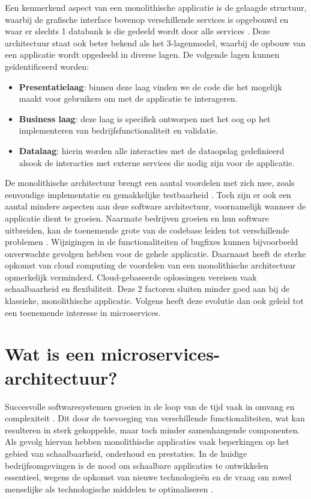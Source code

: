 Een kenmerkend aspect van een monolithische applicatie is de gelaagde structuur, waarbij de grafische interface bovenop verschillende services is opgebouwd en waar er slechts 1 databank is die gedeeld wordt door alle services \autocite{Velepucha2023}. Deze architectuur staat ook beter bekend als het 3-lagenmodel, waarbij de opbouw van een applicatie wordt opgedeeld in diverse lagen. De volgende lagen kunnen geïdentificeerd worden:

\begin{itemize}
	\item \textbf{Presentatielaag}: binnen deze laag vinden we de code die het mogelijk maakt voor gebruikers om met de applicatie te interageren.
	\item \textbf{Business laag}: deze laag is specifiek ontworpen met het oog op het implementeren van bedrijfsfunctionaliteit en validatie.
	\item \textbf{Datalaag}: hierin worden alle interacties met de dataopslag gedefinieerd alsook de interacties met externe services die nodig zijn voor de applicatie.
\end{itemize}

De monolithische architectuur brengt een aantal voordelen met zich mee, zoals eenvoudige implementatie en gemakkelijke testbaarheid \autocite{Li2022}. Toch zijn er ook een aantal mindere aspecten aan deze software architectuur, voornamelijk wanneer de applicatie dient te groeien. Naarmate bedrijven groeien en hun software uitbreiden, kan de toenemende grote van de codebase leiden tot verschillende problemen \autocite{Wei2025}. Wijzigingen in de functionaliteiten of bugfixes kunnen bijvoorbeeld onverwachte gevolgen hebben voor de gehele applicatie. Daarnaast heeft de sterke opkomst van cloud computing de voordelen van een monolithische architectuur opmerkelijk verminderd. Cloud-gebaseerde oplossingen vereisen vaak schaalbaarheid en flexibiliteit. Deze 2 factoren sluiten minder goed aan bij de klassieke, monolithische applicatie. Volgens \textcite{Wei2025} heeft deze evolutie dan ook geleid tot een toenemende interesse in microservices.

\section{Wat is een microservices-architectuur?}

Succesvolle softwaresystemen groeien in de loop van de tijd vaak in omvang en complexiteit \autocite{Abgaz2023}. Dit door de toevoeging van verschillende functionaliteiten, wat kan resulteren in sterk gekoppelde, maar toch minder samenhangende componenten. Als gevolg hiervan hebben monolithische applicaties vaak beperkingen op het gebied van schaalbaarheid, onderhoud en prestaties. In de huidige bedrijfsomgevingen is de nood om schaalbare applicaties te ontwikkelen essentieel, wegens de opkomst van nieuwe technologieën en de vraag om zowel menselijke als technologische middelen te optimaliseren \autocite{Nayim2023}.\newline

